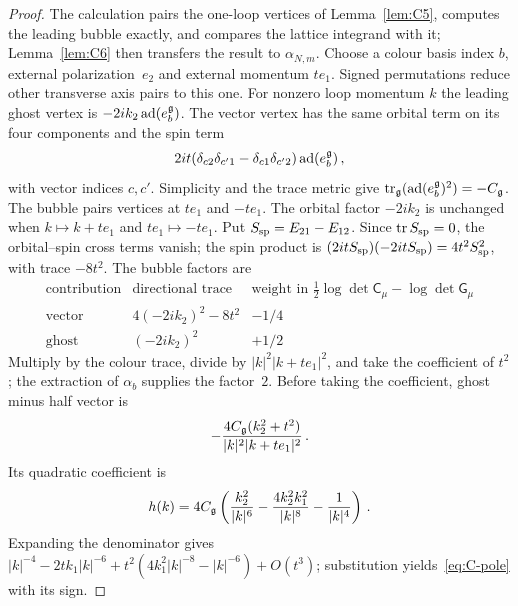 \begin{proof}
The calculation pairs the one-loop vertices of Lemma~\ref{lem:C5}, computes the leading bubble exactly, and compares the lattice integrand with it; Lemma~\ref{lem:C6} then transfers the result to $\alpha_{N,m}$. Choose a colour basis index $b$, external polarization~$e_2$ and external momentum $te_1$. Signed permutations reduce other transverse axis pairs to this one. For nonzero loop momentum $k$ the leading ghost vertex is $-2ik_2\operatorname{ad}(e_b^{\mathfrak{g}})$. The vector vertex has the same orbital term on its four components and the spin term
\begin{equation*}
2it(\delta_{c2}\delta_{c'1}-\delta_{c1}\delta_{c'2})\operatorname{ad}(e_b^{\mathfrak{g}})\,,
\end{equation*}
with vector indices $c,c'$. Simplicity and the trace metric give $\operatorname{tr}_{\mathfrak{g}}(\operatorname{ad}(e_b^{\mathfrak{g}})^2)=-C_{\mathfrak{g}}$. The bubble pairs vertices at $te_1$ and $-te_1$. The orbital factor $-2ik_2$ is unchanged when $k\mapsto k+te_1$ and $te_1\mapsto-te_1$. Put $S_{\rm sp}=E_{21}-E_{12}$. Since $\operatorname{tr} S_{\rm sp}=0$, the orbital--spin cross terms vanish; the spin product is $(2itS_{\rm sp})(-2itS_{\rm sp})=4t^2S_{\rm sp}^2$, with trace $-8t^2$. The bubble factors are
\begin{equation*}
\begin{array}{l|c|c}
\text{contribution}&\text{directional trace}&\text{weight in }\tfrac12\log\det\mathsf C_\mu-\log\det\mathsf G_\mu\\\hline
\text{vector}&4(-2ik_2)^2-8t^2&-1/4\\
\text{ghost}&(-2ik_2)^2&+1/2
\end{array}
\end{equation*}
Multiply by the colour trace, divide by $|k|^2|k+te_1|^2$, and take the coefficient of $t^2$; the extraction of $\alpha_b$ supplies the factor~$2$. Before taking the coefficient, ghost minus half vector is
\begin{equation*}
-\frac{4C_{\mathfrak{g}}(k_2^2+t^2)}{|k|^2|k+te_1|^2}\,.
\end{equation*}
Its quadratic coefficient is
\begin{equation}\label{eq:C-pole}
h(k)=4C_{\mathfrak{g}}\left(\frac{k_2^2}{|k|^6}-\frac{4k_2^2k_1^2}{|k|^8}-\frac1{|k|^4}\right)\,.
\end{equation}
Expanding the denominator gives $|k|^{-4}-2tk_1|k|^{-6}+t^2(4k_1^2|k|^{-8}-|k|^{-6})+O(t^3)$; substitution yields~\eqref{eq:C-pole} with its sign.


\end{proof}
